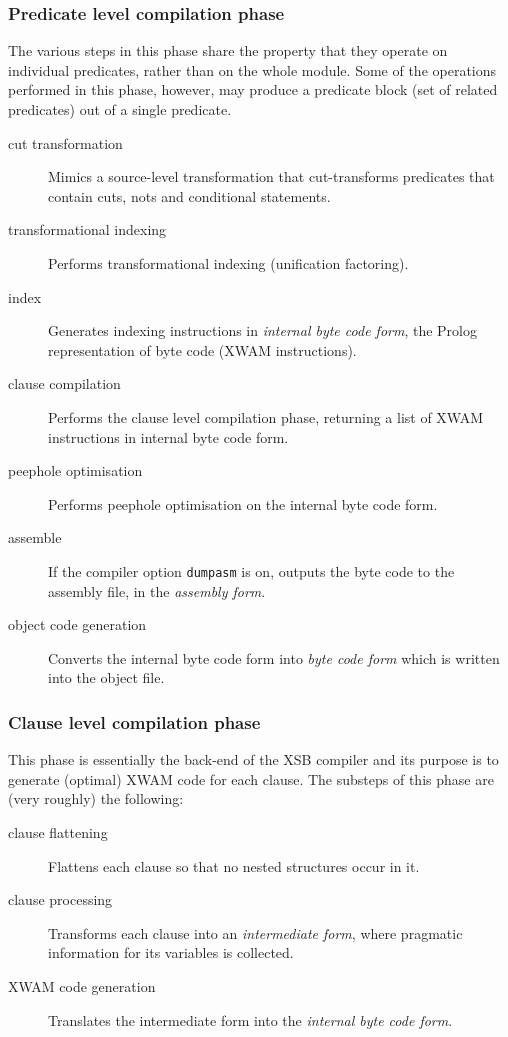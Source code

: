\subsubsection{Predicate level compilation phase}
The various steps in this phase share the property that they operate
on individual predicates, rather than on the whole module.  Some of
the operations performed in this phase, however, may produce a
predicate block (set of related predicates) out of a single predicate. 
\begin{description}
\item[cut transformation]
	Mimics a source-level transformation that cut-transforms predicates
	that contain cuts, nots and conditional statements.
\item[transformational indexing]
	Performs transformational indexing (unification factoring).
\item[index]
	Generates indexing instructions in {\it internal byte code
	form}, the Prolog representation of byte code (XWAM instructions).
\item[clause compilation]
	Performs the clause level compilation phase, returning a list of
	XWAM instructions in internal byte code form.
\item[peephole optimisation]
	Performs peephole optimisation on the internal byte code form.
\item[assemble]
	If the compiler option {\tt dumpasm} is on, outputs the byte code
	to the assembly file, in the {\it assembly form}.
\item[object code generation]
	Converts the internal byte code form into {\it byte code form} which 
	is written into the object file.
\end{description}

\subsubsection{Clause level compilation phase}
This phase is essentially the back-end of the XSB compiler and its
purpose is to generate (optimal) XWAM code for each clause.  The
substeps of this phase are (very roughly) the following:
\begin{description}
\item[clause flattening]
	Flattens each clause so that no nested structures occur in it.
\item[clause processing]
	Transforms each clause into an {\it intermediate form}, where
	pragmatic information for its variables is collected.
\item[XWAM code generation]
	Translates the intermediate form into the {\it internal byte 
	code form}.
\end{description}

